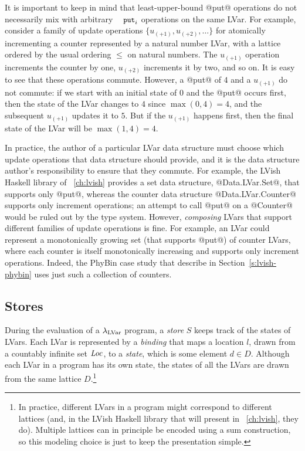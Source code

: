 It is important to keep in mind that least-upper-bound @put@
operations do not necessarily mix with arbitrary $\PUTi$ operations on
the same LVar.  For example, consider a family of update operations
$\{ u_{(+1)}, u_{(+2)}, \dots \}$ for atomically incrementing a
counter represented by a natural number LVar, with a lattice ordered
by the usual ordering $\leq$ on natural numbers.  The $u_{(+1)}$
operation increments the counter by one, $u_{(+2)}$ increments it by
two, and so on.  It is easy to see that these operations commute.
However, a @put@ of $4$ and a $u_{(+1)}$ do not commute: if we start
with an initial state of $0$ and the @put@ occurs first, then the
state of the LVar changes to $4$ since $\max(0, 4) = 4$, and the
subsequent $u_{(+1)}$ updates it to $5$.  But if the $u_{(+1)}$
happens first, then the final state of the LVar will be $\max(1, 4) =
4$.

In practice, the author of a particular LVar data structure must
choose which update operations that data structure should provide, and
it is the data structure author's responsibility to ensure that they
commute.  For example, the LVish Haskell library of
~\ref{ch:lvish} provides a set data
structure, @Data.LVar.Set@, that supports only @put@, whereas the
counter data structure @Data.LVar.Counter@ supports only increment
operations; an attempt to call @put@ on a @Counter@ would be ruled out
by the type system.  However, \emph{composing} LVars that support
different families of update operations is fine.  For example, an LVar
could represent a monotonically growing set (that supports @put@) of
counter LVars, where each counter is itself monotonically increasing
and supports only increment operations.  Indeed, the PhyBin case study
that  describe in Section~\ref{s:lvish-phybin} uses just
such a collection of counters.

\subsection{Stores}\label{subsection:lvars-stores}

During the evaluation of a $\lambda_{\textrm{LVar}}$ program, a \emph{store} $S$
keeps track of the states of LVars.  Each LVar is represented by a
\emph{binding} that maps a location $l$, drawn from a countably infinite
set $\mathit{Loc}$, to a \emph{state}, which is some element $d \in D$.
Although each LVar in a program has its own state, the states of all
the LVars are drawn from the same lattice $D$.\footnote{In practice,
  different LVars in a program might correspond to different lattices (and,
  in the LVish Haskell library that  will present in
  ~\ref{ch:lvish}, they do).  Multiple lattices can in
  principle be encoded using a sum construction, so this modeling
  choice is just to keep the presentation simple.}

